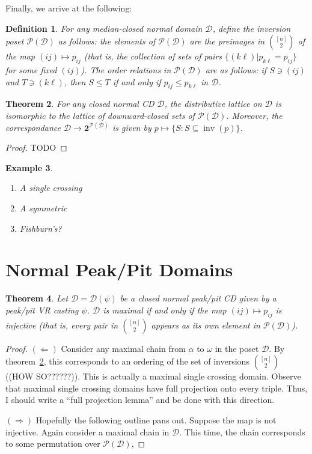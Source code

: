\documentclass[12pt]{article}
\newtheorem{theorem}{Theorem}
\newtheorem{definition}[theorem]{Definition}
\newtheorem{example}[theorem]{Example}
\newcommand{\D}{\mathcal{D}}
\newcommand{\PP}{\mathcal{P}}
\newcommand{\PowerSet}[1]{\mathbf{2}^{#1}}
\DeclareMathOperator*{\inv}{inv}
\newcommand{\1}[1]{\mathds{1}[{#1}]}
\begin{document}
  Finally, we arrive at the following:
  \begin{definition}
    For any median-closed normal domain $\D$,
    define the \emph{inversion poset} $\PP(\D)$ as follows:
    the elements of $\PP(\D)$ are the preimages in $[n]\choose 2$
    of the map $(ij)\mapsto p_{ij}$ (that is, the collection of sets of pairs
    $\{(k\ell) | p_{k\ell}=p_{ij}\}$ for some fixed $(ij)$).
    The order relations in $\PP(\D)$ are as follows:
    if $S\ni (ij)$ and $T\ni (k\ell)$, then 
    $S\le T$ if and only if $p_{ij}\le p_{k\ell}$ in $\D$.
  \end{definition}
  \begin{theorem}\label{thrmBijectDownsets}
    For any closed normal CD $\D$, the distributive lattice on $\D$ is
    isomorphic to the lattice of downward-closed sets of $\PP(\D)$.
    Moreover, the correspondance $\D\to\PowerSet{\PP(\D)}$ is
    given by $p\mapsto \{S : S\subseteq \inv(p)\}$.
  \end{theorem}
  \begin{proof}
    TODO
  \end{proof}

  \begin{example}
    \begin{enumerate}
      \item A single crossing
      \item A symmetric
      \item Fishburn's?
    \end{enumerate}
  \end{example}

\section{Normal Peak/Pit Domains}
  \begin{theorem}
    Let $\D = \D(\psi)$ be a closed normal peak/pit CD
    given by a peak/pit VR casting $\psi$.
    $\D$ is maximal if and only if the map $(ij)\mapsto p_{ij}$
    is injective (that is, every pair in $[n]\choose 2$ appears as
    its own element in $\PP(\D)$).
  \end{theorem}
  \begin{proof}
    $(\Longleftarrow)$ Consider any maximal chain from $\alpha$ to
    $\omega$ in the poset $\D$. By theorem~\ref{thrmBijectDownsets},
    this corresponds to an ordering of the set of inversions $[n]\choose 2$
    ((HOW SO??????)).
    This is actually a maximal single crossing domain.
    Observe that maximal single crossing domains have full projection onto every
    triple. Thus, I should write a ``full projection lemma'' and be done with
    this direction.

    $(\Longrightarrow)$
    Hopefully the following outline pans out.
    Suppose the map is not injective.
    Again consider a maximal chain in $\D$. This time, the chain corresponds to
    some permutation over $\PP(\D)$,

  \end{proof}
\end{document}
